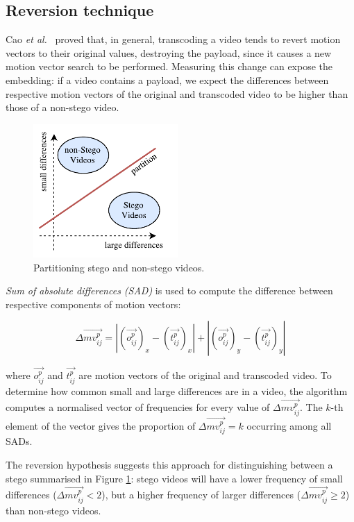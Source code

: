 \documentclass[12pt,british,twoside,notitlepage,usenames,dvipsnames,hypens,final]{report}
\numberwithin{equation}{section}
\numberwithin{figure}{section}
\begin{document}
\subsection{Reversion technique}
\label{rev-tech-theory}
Cao \emph{et al.}~\cite{cao2012video} proved that, in general, transcoding a video tends to revert motion vectors to their original values, destroying the payload, since it causes a new motion vector search to be performed. Measuring this change can expose the embedding: if a video contains a payload, we expect the differences between respective motion vectors of the original and transcoded video to be higher than those of a non-stego video.

\begin{figure}
\vspace{-15pt}
\centering
\includegraphics[width=5.5cm]{img/movest_reversion_sketch.pdf}
\caption{Partitioning stego and non-stego videos.}
\label{fig:movest-reversion-sketch}
\end{figure}

\emph{Sum of absolute differences (SAD)} is used to compute the difference between respective components of motion vectors:

$$ \Delta \overrightarrow{mv^p_{ij}} = |(\overrightarrow{o^p_{ij}})_x - (\overrightarrow{t^p_{ij}})_x| +  |(\overrightarrow{o^p_{ij}})_y - (\overrightarrow{t^p_{ij}})_y|$$

where $\overrightarrow{o^p_{ij}}$ and $\overrightarrow{t^p_{ij}}$ are motion vectors of the original and transcoded video. To determine how common small and large differences are in a video, the algorithm computes a normalised vector of frequencies for every value of $\Delta\overrightarrow{mv^p_{ij}}$. The $k$-th element of the vector gives the proportion of $\Delta\overrightarrow{mv^p_{ij}} = k$ occurring among all SADs.

The reversion hypothesis suggests this approach for distinguishing between a stego summarised in Figure \ref{fig:movest-reversion-sketch}: stego videos will have a lower frequency of small differences ($\Delta\overrightarrow{mv^p_{ij}} < 2$), but a higher frequency of larger differences ($\Delta\overrightarrow{mv^p_{ij}} \geq 2$) than non-stego videos.
\end{document}
